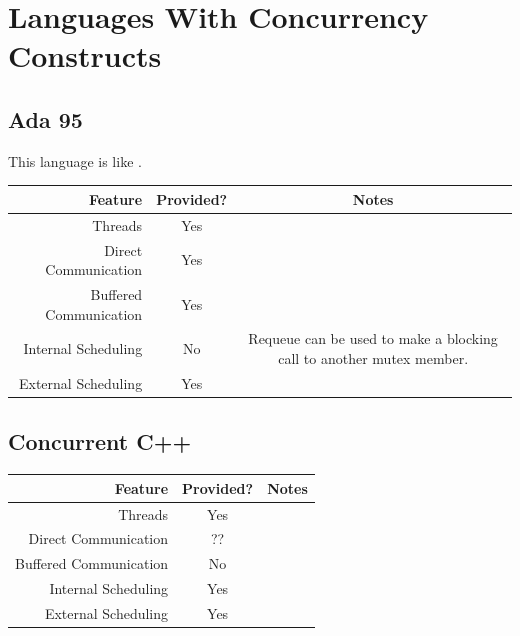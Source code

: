         \section{Languages With Concurrency Constructs} %
        \label{sec:languages_with_concurrency_constructs}
            \subsection{Ada 95} %
            \label{sub:ada_95}
                This language is like \uC.
                \begin{table}[h]
                    \label{tbl:ada_concurrency}
                    \centering
                    \begin{tabular}{| r || c | c |}
                        \hline
                        Feature & Provided? & Notes \\ \hline \hline
                        Threads                 & Yes & \\ \hline
                        Direct Communication    & Yes & \\ \hline
                        Buffered Communication  & Yes & \\ \hline
                        Internal Scheduling     & No & Requeue can be used to make a blocking call to another mutex member. \\ \hline
                        External Scheduling     & Yes & \\ \hline
                    \end{tabular}
                \end{table}
            \subsection{Concurrent C++} %
            \label{sub:concurrent_c_}
                \begin{table}[h]
                    \label{tbl:concurrent_cpp}
                    \centering
                    \begin{tabular}{| r || c | c |}
                        \hline
                        Feature                 & Provided? & Notes \\ \hline \hline
                        Threads                 & Yes & \\ \hline
                        Direct Communication    & ?? & \\ \hline
                        Buffered Communication  & No & \\ \hline
                        Internal Scheduling     & Yes & \\ \hline
                        External Scheduling     & Yes & \\ \hline
                    \end{tabular}
                \end{table}
